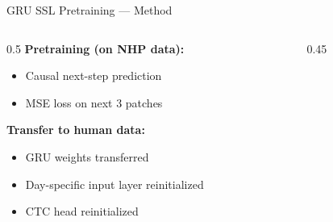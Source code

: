\documentclass[aspectratio=169]{beamer}
\begin{document}
\begin{frame}{GRU SSL Pretraining — Method}
  \begin{columns}
    \begin{column}{0.5\textwidth}
      \textbf{Pretraining (on NHP data):}
      \begin{itemize}
        \item Causal next-step prediction
        \item MSE loss on next 3 patches
      \end{itemize}
      \vspace{0.5em}
      \textbf{Transfer to human data:}
      \begin{itemize}
        \item GRU weights transferred
        \item Day-specific input layer reinitialized
        \item CTC head reinitialized
      \end{itemize}
    \end{column}
    \begin{column}{0.45\textwidth}
      \begin{center}
      \end{center}
    \end{column}
  \end{columns}
\end{frame}
\end{document}
